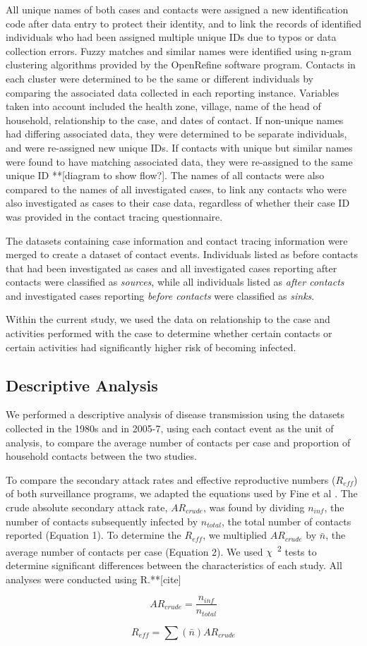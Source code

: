 All unique names of both cases and contacts were assigned a new identification code after data entry to protect their identity, and to link the records of identified individuals who had been assigned multiple unique IDs due to typos or data collection errors. Fuzzy matches and similar names were identified using n-gram clustering algorithms provided by the OpenRefine software program. Contacts in each cluster were determined to be the same or different individuals by comparing the associated data collected in each reporting instance. Variables taken into account included the health zone, village, name of the head of household, relationship to the case, and dates of contact. If non-unique names had differing associated data, they were determined to be separate individuals, and were re-assigned new unique IDs. If contacts with unique but similar names were found to have matching associated data, they were re-assigned to the same unique ID **[diagram to show flow?]. The names of all contacts were also compared to the names of all investigated cases, to link any contacts who were also investigated as cases to their case data, regardless of whether their case ID was provided in the contact tracing questionnaire. 

The datasets containing case information and contact tracing information were merged to create a dataset of contact events. Individuals listed as before contacts that had been investigated as cases and all investigated cases reporting after contacts were classified as \textit{sources}, while all individuals listed as \textit{after contacts} and investigated cases reporting \textit{before contacts} were classified as \textit{sinks}.

Within the current study, we used the data on relationship to the case and activities performed with the case to determine whether certain contacts or certain activities had significantly higher risk of becoming infected.

\subsection{Descriptive Analysis}
We performed a descriptive analysis of disease transmission using the datasets collected in the 1980s and in 2005-7, using each contact event as the unit of analysis, to compare the average number of contacts per case and proportion of household contacts between the two studies.  

To compare the secondary attack rates and effective reproductive numbers ($R_{eff}$) of both surveillance programs, we adapted the equations used by Fine et al \cite{Fine1988}. The crude absolute secondary attack rate, $AR_{crude}$, was found by dividing $n_{inf}$, the number of contacts subsequently infected by $n_{total}$, the total number of contacts reported (Equation 1). To determine the $R_{eff}$, we multiplied $AR_{crude}$ by $\bar{n}$, the average number of contacts per case (Equation 2). We used $\chi$\ \textsuperscript{2} tests to determine significant differences between the characteristics of each study. All analyses were conducted using R.**[cite]

\begin{equation}
\label{eqn:equation 1}
AR_{crude}=\frac{n_{inf}}{n_{total}}
\end{equation}

\begin{equation}
\label{eqn:equation 2}
R_{eff}=\sum \left ( \bar{n} \right )AR_{crude}
\end{equation}